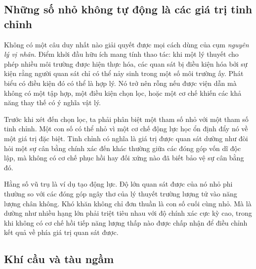 \subsection{Những số nhỏ không tự động là các giá trị tinh chỉnh}

Không có một câu duy nhất nào giải quyết được mọi cách dùng của cụm \emph{nguyên lý vị nhân}. Điểm khởi đầu hữu ích mang tính thao tác: khi một lý thuyết cho phép nhiều môi trường được hiện thực hóa, các quan sát bị điều kiện hóa bởi sự kiện rằng người quan sát chỉ có thể nảy sinh trong một số môi trường ấy. Phát biểu có điều kiện đó có thể là hợp lý. Nó trở nên rỗng nếu được viện dẫn mà không có một tập hợp, một điều kiện chọn lọc, hoặc một cơ chế khiến các khả năng thay thế có ý nghĩa vật lý.

Trước khi xét đến chọn lọc, ta phải phân biệt một tham số nhỏ với một tham số tinh chỉnh. Một con số có thể nhỏ vì một cơ chế động lực học ổn định đẩy nó về một giá trị đặc biệt. Tinh chỉnh có nghĩa là giá trị được quan sát dường như đòi hỏi một sự cân bằng chính xác đến khác thường giữa các đóng góp vốn dĩ độc lập, mà không có cơ chế phục hồi hay đối xứng nào đã biết bảo vệ sự cân bằng đó.

\begin{classroomqa}
\end{classroomqa}

Hằng số vũ trụ là ví dụ tạo động lực. Độ lớn quan sát được của nó nhỏ phi thường so với các đóng góp ngây thơ của lý thuyết trường lượng tử vào năng lượng chân không. Khó khăn không chỉ đơn thuần là con số cuối cùng nhỏ. Mà là dường như nhiều hạng lớn phải triệt tiêu nhau với độ chính xác cực kỳ cao, trong khi không có cơ chế hồi tiếp năng lượng thấp nào được chấp nhận để điều chỉnh kết quả về phía giá trị quan sát được.

\subsection{Khí cầu và tàu ngầm}

